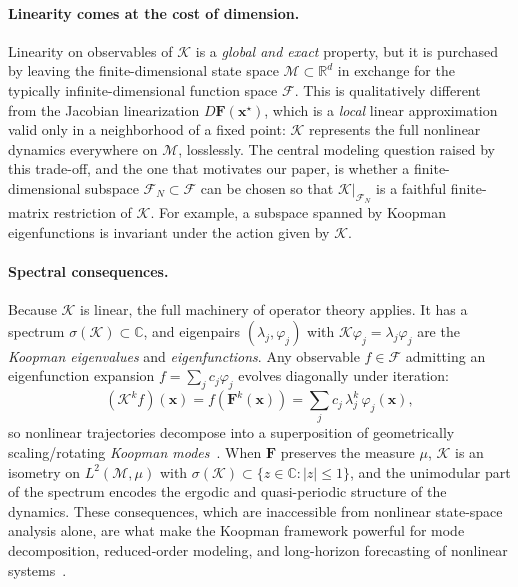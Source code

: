 \documentclass{article}
\theoremstyle{plain}
\theoremstyle{definition}
\def\R{\mathbb{R}}
\def\x{\mathbf{x}}
\def\Koop{\mathcal{K}}
\def\Fc{\mathcal{F}}
\def\Mc{\mathcal{M}}
\newcommand{\arXivtag}[1][]{#1}
\begin{document}
\paragraph{Linearity comes at the cost of dimension.}
Linearity on observables of $\Koop$ is a \emph{global and exact} property, but it is purchased by leaving the finite-dimensional state space $\Mc\subset\R^d$ in exchange for the typically infinite-dimensional function space $\Fc$. This is qualitatively different from the Jacobian linearization $D\mathbf{F}(\x^\star)$, which is a \emph{local} linear approximation valid only in a neighborhood of a fixed point: $\Koop$ represents the full nonlinear dynamics everywhere on $\Mc$, losslessly. The central modeling question raised by this trade-off, and the one that motivates our paper, is whether a finite-dimensional subspace $\Fc_N\subset\Fc$ can be chosen so that $\Koop|_{\Fc_N}$ is a faithful finite-matrix restriction of $\Koop$. For example, a subspace spanned by Koopman eigenfunctions is invariant under the action given by $\Koop$. 

\paragraph{Spectral consequences.}
Because $\Koop$ is linear, the full machinery of operator theory applies. It has a spectrum $\sigma(\Koop)\subset\mathbb{C}$, and eigenpairs $(\lambda_j,\varphi_j)$ with $\Koop\varphi_j = \lambda_j\varphi_j$ are the \emph{Koopman eigenvalues} and \emph{eigenfunctions}. Any observable $f\in\Fc$ admitting an eigenfunction expansion $f = \sum_j c_j\varphi_j$ evolves diagonally under iteration:
\begin{equation}\label{eq:koopman-spectral-evolution}
	(\Koop^k f)(\x) = f(\mathbf{F}^k(\x)) = \sum_j c_j\,\lambda_j^k\,\varphi_j(\x),
\end{equation}
so nonlinear trajectories decompose into a superposition of geometrically scaling/rotating \emph{Koopman modes}~\cite{Mezic2013AnnRevFluid,rowley2009spectral}. When $\mathbf{F}$ preserves the measure $\mu$, $\Koop$ is an isometry on $L^2(\Mc,\mu)$ with $\sigma(\Koop)\subset\{z\in\mathbb{C}:|z|\leq 1\}$, and the unimodular part of the spectrum encodes the ergodic and quasi-periodic structure of the dynamics. These consequences\arXivtag, which are inaccessible from nonlinear state-space analysis alone, are what make the Koopman framework powerful for mode decomposition, reduced-order modeling, and long-horizon forecasting of nonlinear systems~\cite{mezic2021koopman,otto2021koopman,colbrook2024beyond}.
\end{document}

